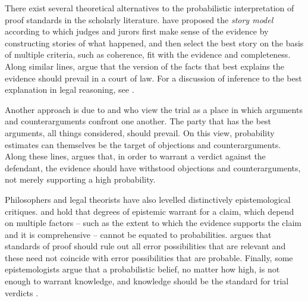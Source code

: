 \documentclass{article}
\begin{document}
There exist several theoretical alternatives to the probabilistic interpretation of proof standards in the scholarly literature. 
\cite{Pennington1991, penn1993} have proposed the \textit{story model}   according to which judges and jurors first make sense of the evidence by constructing stories of what happened, and then select the best story on the basis of multiple criteria, such as coherence, fit with the evidence and completeness.
Along similar lines, \cite{Pardo2008Judicial-Proof-} argue that the version of the facts that best explains the evidence should prevail in a court of law. For a discussion of inference to the best explanation in legal reasoning, see  \cite{schwartz2019WhatRelativePlausibility,hastie2019CaseRelativePlausibilitya,lai2019HowPlausibleRelative,nance2019LimitationsRelativePlausibility}.%
%


Another approach is due to \cite{gordon2007} and \cite{prakken2009} who view the trial as a place in which  arguments and counterarguments confront one another.  The party that has the best arguments, all things considered, should prevail.  On this view, probability estimates can themselves be the target of objections and counterarguments. 
Along these lines,  \cite{stein2008} argues that,  in order to warrant a verdict against the defendant, the evidence should have withstood objections and counterarguments, not merely supporting a high probability.


Philosophers and 
legal theorists have also levelled distinctively epistemological critiques. \cite{ho2008philosophy} and \cite{Haack2014-HAAEMS} %
hold that degrees of epistemic warrant for a claim, which depend on multiple factors -- such as the extent to which the evidence supports the claim and it is comprehensive -- cannot be equated to probabilities.  \cite{gardiner2019ppa} argues that standards of proof should rule out all error possibilities that are relevant and these need not coincide with error possibilities that are probable. Finally, some epistemologists  argue that a probabilistic belief, no matter how high, is not enough to warrant knowledge, and knowledge should be the standard for trial verdicts \citep{DuffEtAl20017, littlejohn2017, BlomeTillmann2017, levanon2019, moss2020}.
\end{document}
